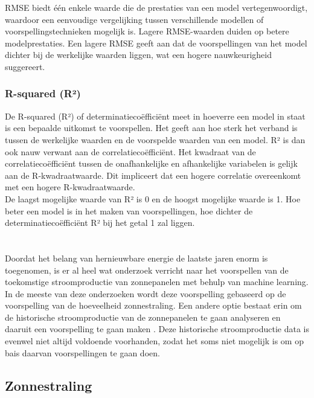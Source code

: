 RMSE biedt één enkele waarde die de prestaties van een model vertegenwoordigt, waardoor een eenvoudige vergelijking tussen verschillende modellen of voorspellingstechnieken mogelijk is. Lagere RMSE-waarden duiden op betere modelprestaties. Een lagere RMSE geeft aan dat de voorspellingen van het model dichter bij de werkelijke waarden liggen, wat een hogere nauwkeurigheid suggereert.

\subsubsection{R-squared (R²)}

De R-squared (R²) of determinatiecoëfficiënt meet in hoeverre een model in staat is een bepaalde uitkomst te voorspellen. Het geeft aan hoe sterk het verband is tussen de werkelijke waarden en de voorspelde waarden van een model. R² is dan ook nauw verwant aan de correlatiecoëfficiënt. Het kwadraat van de correlatiecoëfficiënt tussen de onafhankelijke en afhankelijke variabelen is gelijk aan de R-kwadraatwaarde. Dit impliceert dat een hogere correlatie overeenkomt met een hogere R-kwadraatwaarde. \\

De laagst mogelijke waarde van R² is 0 en de hoogst mogelijke waarde is 1. Hoe beter een model is in het maken van voorspellingen, hoe dichter de determinatiecoëfficiënt R² bij het getal 1 zal liggen.

\section{}%
\label{sec:elektriciteitsproductie voorspellen}

Doordat het belang van hernieuwbare energie de laatste jaren enorm is toegenomen, is er al heel wat onderzoek verricht naar het voorspellen van de toekomstige stroomproductie van zonnepanelen met behulp van machine learning. In de meeste van deze onderzoeken wordt deze voorspelling gebaseerd op de voorspelling van de hoeveelheid zonnestraling. Een andere optie bestaat erin om de historische stroomproductie van de zonnepanelen te gaan analyseren en daaruit een voorspelling te gaan maken \autocite{Wang2022}. Deze historische stroomproductie data is evenwel niet altijd voldoende voorhanden, zodat het soms niet mogelijk is om op bais daarvan voorspellingen te gaan doen.

\subsection{Zonnestraling}

